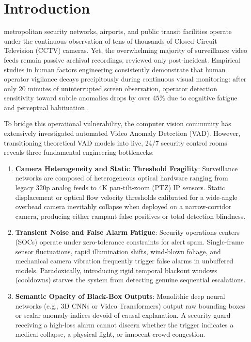 \documentclass[conference]{IEEEtran}
\begin{document}
\section{Introduction}

 metropolitan security networks, airports, and public transit facilities operate under the continuous observation of tens of thousands of Closed-Circuit Television (CCTV) cameras. Yet, the overwhelming majority of surveillance video feeds remain passive archival recordings, reviewed only post-incident. Empirical studies in human factors engineering consistently demonstrate that human operator vigilance decays precipitously during continuous visual monitoring: after only 20 minutes of uninterrupted screen observation, operator detection sensitivity toward subtle anomalies drops by over $45\%$ due to cognitive fatigue and perceptual habituation \cite{surveillance_fatigue}.

To bridge this operational vulnerability, the computer vision community has extensively investigated automated Video Anomaly Detection (VAD). However, transitioning theoretical VAD models into live, 24/7 security control rooms reveals three fundamental engineering bottlenecks:

\begin{enumerate}
    \item \textbf{Camera Heterogeneity and Static Threshold Fragility}: Surveillance networks are composed of heterogeneous optical hardware ranging from legacy 320p analog feeds to 4K pan-tilt-zoom (PTZ) IP sensors. Static displacement or optical flow velocity thresholds calibrated for a wide-angle overhead camera inevitably collapse when deployed on a narrow-corridor camera, producing either rampant false positives or total detection blindness.
    \item \textbf{Transient Noise and False Alarm Fatigue}: Security operations centers (SOCs) operate under zero-tolerance constraints for alert spam. Single-frame sensor fluctuations, rapid illumination shifts, wind-blown foliage, and mechanical camera vibration frequently trigger false alarms in unbuffered models. Paradoxically, introducing rigid temporal blackout windows (cooldowns) starves the system from detecting genuine sequential escalations.
    \item \textbf{Semantic Opacity of Black-Box Outputs}: Monolithic deep neural networks (e.g., 3D CNNs or Video Transformers) output raw bounding boxes or scalar anomaly indices devoid of causal explanation. A security guard receiving a high-loss alarm cannot discern whether the trigger indicates a medical collapse, a physical fight, or innocent crowd congestion.
\end{enumerate}
\end{document}
